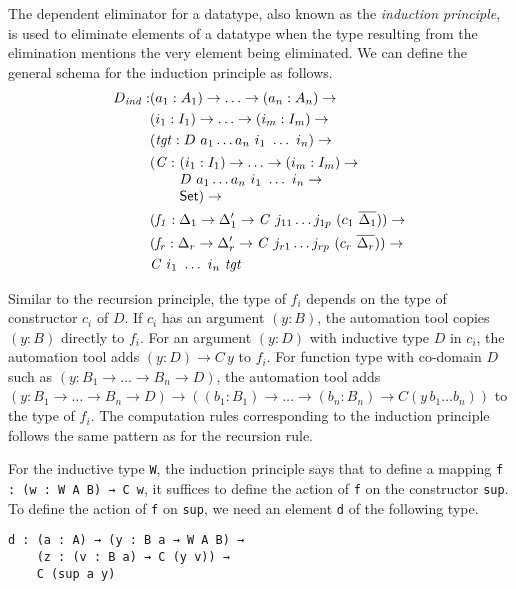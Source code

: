 \documentclass[sigplan,10pt]{acmart}
\begin{document}
The dependent eliminator for a datatype, also known as the \emph{induction principle}, is used to eliminate elements of a datatype when the type resulting from the elimination mentions the very element being eliminated. We can define the general schema for the induction principle as follows.
\begin{align*}
D_{\mathit{ind}} : & (a_1 : A_1) \to \ldots \to (a_n : A_n) \to\\
& (i_1 : I_1) \to \ldots \to (i_m : I_m) \to\\
& (\mathit{tgt} : D\ a_1 \ldots a_n\ i_1\ \ldots\ i_n) \to\\
& \begin{array}{@{}l@{}l}(\mathit{C} :\ & (i_1 : I_1) \to \ldots \to (i_m : I_m) \to\\  & D\ a_1 \ldots a_n\ i_1\ \ldots\ i_n \to\\ &\SET{})\to\end{array} \\
& (\mathit{f_1} : \Delta_1 \to  \Delta_1^\prime \to \mathit{C}\ j_{11} \ldots j_{1p}\ (c_1\ \overline{\Delta_1})) \to \\
& (\mathit{f_r} : \Delta_r \to  \Delta_r^\prime \to \mathit{C}\ j_{r1} \ldots j_{rp}\ (c_r\ \overline{\Delta_r})) \to \\
& \mathit{C}\ i_1\ \ldots\ i_n\ \mathit{tgt}
\end{align*}

Similar to the recursion principle, the type of $f_i$ depends on the type of constructor $c_i$ of $D$. If $c_i$ has an argument $(y : B)$, the automation tool copies $(y : B)$ directly to $f_i$. For an argument $(y : D)$ with inductive type $D$ in $c_i$, the automation tool adds $(y : D) \to C \, y$ to $f_i$. For function type with co-domain $D$ such as $(y : B_1 \to\ldots\to B_n \to D)$, the automation tool adds $(y : B_1 \to \ldots \to B_n \to D) \to ((b_1 : B_1) \to \ldots \to (b_n : B_n) \to C (y \, b_1 \ldots b_n))$ to the type of $f_i$. The computation rules corresponding to the induction principle follows the same pattern as for the recursion rule.

For the inductive type {\tt W}, the induction principle says that to define a mapping {\tt f : (w : W A B) → C w}, it suffices to define the action of {\tt f} on the constructor {\tt sup}. To define the action of {\tt f} on {\tt sup}, we need an element {\tt d} of the following type.

\begin{center}
\begingroup
\begin{BVerbatim}
d : (a : A) → (y : B a → W A B) → 
    (z : (v : B a) → C (y v)) → 
    C (sup a y)
\end{BVerbatim}
\endgroup
\end{center}
\end{document}
